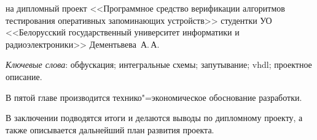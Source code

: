 \thispagestyle{empty}

\begin{center}
  \begin{minipage}{0.82\textwidth}
    на дипломный проект <<Программное средство верификации алгоритмов тестирования оперативных запоминающих устройств>> студентки УО <<Белорусский государственный университет информатики и радиоэлектроники>> Дементьвева~А.\,А.
  \end{minipage}
\end{center}

\emph{Ключевые слова}: обфускация; интегральные схемы; запутывание; vhdl; проектное описание.

\vspace{4\parsep}









В пятой главе производится технико"=экономическое обоснование разработки.

В заключении подводятся итоги и делаются выводы по дипломному проекту, а также описывается дальнейший план развития проекта.

\clearpage